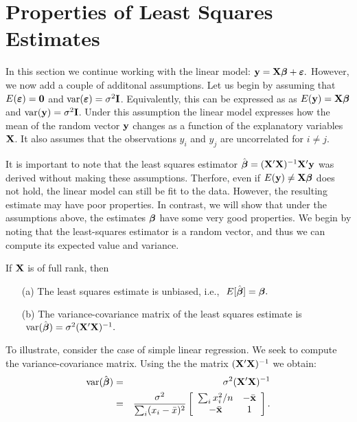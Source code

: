 \section{Properties of Least Squares Estimates}

\vb
In this section we continue working with the linear model: $\mathbf{y=X\mbox{\boldmath $\beta$} + \mbox{\boldmath $\varepsilon$}}.$ 
However, we now add a couple of additonal assumptions. Let us begin by assuming that $E(\mbox{\boldmath $\varepsilon$}) = \mathbf{0}$ and $\mathrm{var}(\mbox{\boldmath $\varepsilon$}) = \sigma^2 \mathbf{I}$. Equivalently, this can be expressed as as $E(\mathbf{y}) = \mathbf{X} \mbox{\boldmath $\beta$}$ and $\mathrm{var}(\mathbf{y}) = \sigma^2 {\bf I}$. Under this assumption the linear model expresses how the mean of the random vector $\mathbf{y}$ changes as a function of the explanatory variables $\mathbf{X}$. It also assumes that the observations $y_i$ and $y_j$ are uncorrelated for $i \neq j$.

It is important to note that the least squares estimator $\hat  {\mbox{\boldmath $\beta$}} = (\mathbf{X}' \mathbf{X})^{-1} \mathbf{X}' \mathbf{y}$ was derived without making these assumptions. Therfore, even if $E(\mathbf{y}) \neq \mathbf{X} \mbox{\boldmath $\beta$}$ does not hold, the linear model can still be fit to the data. However, the resulting estimate may have poor properties. In contrast, we will show that under the assumptions above, the estimates $\mbox{\boldmath $\beta$}$ have some very good properties. We begin by noting that the least-squares estimator is a random vector, and thus we can compute its expected value and variance.

\btheo
If $\mathbf{X}$ is of full rank, then
\begin{itemize}
\item[(a)]
The least squares estimate is unbiased, i.e., $\ E[\hat{\mbox{\boldmath $\beta$}}] = \mbox{\boldmath $\beta$}.$
\item[(b)]
The variance-covariance matrix of the least squares estimate is $\
\mathrm{var}(\hat{\mbox{\boldmath $\beta$}}) = \sigma^2 (\mathbf{X}'\mathbf{X})^{-1}.$
\end{itemize}
\estheo


\bexa
To illustrate, consider the case of simple linear regression.
We seek to compute the variance-covariance matrix.
Using the the matrix $(\mathbf{X}'\mathbf{X})^{-1}$ we obtain:
\begin{eqnarray*}
\mathrm{var}(\hat{\mbox{\boldmath $\beta$}}) &=& \sigma^2 (\mathbf{X}'\mathbf{X})^{-1} \\
&=& \frac{\sigma^2}{\sum_i (x_i - {\bar x})^2}
\left[
\begin{array}{cc}
\sum_i x_i^2/n & -{\bar {\mathbf{x}}}\\
-{\bar {\mathbf{x}}} & 1
\end{array}
\right] .
\end{eqnarray*}


